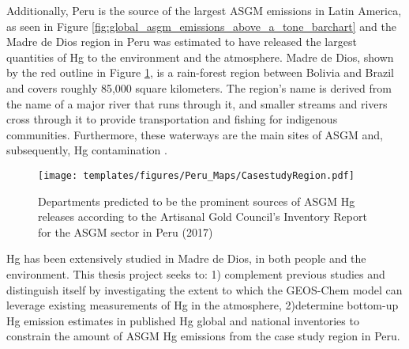 \begin{flushleft}
Additionally, Peru is the source of the largest ASGM emissions in Latin America, as seen in Figure \ref{fig:global_asgm_emissions_above_a_tone_barchart} and the Madre de Dios region in Peru was estimated to have released the largest quantities of Hg to the environment and the atmosphere\cite{agc_reporte_2017}. Madre de Dios, shown by the red outline in Figure \ref{fig:PeruCS}, is a rain-forest region between Bolivia and Brazil and covers roughly 85,000 square kilometers. The region's name is derived from the name of a major river that runs through it, and smaller streams and rivers cross through it to provide transportation and fishing for indigenous communities. Furthermore, these waterways are the main sites of ASGM and, subsequently, Hg contamination \cite{ashe_elevated_2012,agc_reporte_2017}. 
\begin{figure}[H]
  \texttt{[image: templates/figures/Peru\_Maps/CasestudyRegion.pdf]}
  \centering
  \caption{Departments predicted to be the prominent sources of ASGM Hg releases according to the Artisanal Gold Council's  Inventory Report for the ASGM sector in Peru (2017) }
  \label{fig:PeruCS}
\end{figure}
\FloatBarrier

Hg has been extensively studied in Madre de Dios, in both people and the environment. This thesis project seeks to: 1) complement previous studies and distinguish itself  by investigating the extent to which the GEOS-Chem model can leverage existing measurements of Hg in the atmosphere, 2)determine bottom-up Hg emission estimates in published Hg global and national inventories to constrain the amount of ASGM Hg emissions from the case study region in Peru. 

\end{flushleft}
